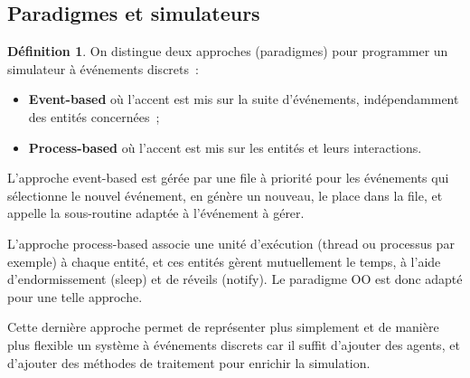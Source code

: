 \documentclass{article}
\theoremstyle{definition}
\newtheorem{déf}[thm]{Définition}
\theoremstyle{remark}
\begin{document}
	\subsection{Paradigmes et simulateurs}

	\begin{déf} On distingue deux approches (paradigmes) pour programmer un simulateur à événements discrets~:
	\begin{itemize}
		\item \textbf{Event-based} où l'accent est mis sur la suite d'événements, indépendamment des entités concernées~;
		\item \textbf{Process-based} où l'accent est mis sur les entités et leurs interactions.
	\end{itemize}
	\end{déf}

	L'approche event-based est gérée par une file à priorité pour les événements qui sélectionne le nouvel événement, en génère un nouveau, le place dans la
	file, et appelle la sous-routine adaptée à l'événement à gérer.

	L'approche process-based associe une unité d'exécution (thread ou processus par exemple) à chaque entité, et ces entités gèrent mutuellement le temps, à
	l'aide d'endormissement (sleep) et de réveils (notify). Le paradigme OO est donc adapté pour une telle approche.

	Cette dernière approche permet de représenter plus simplement et de manière plus flexible un système à événements discrets car il suffit d'ajouter des
	agents, et d'ajouter des méthodes de traitement pour enrichir la simulation.
\end{document}
